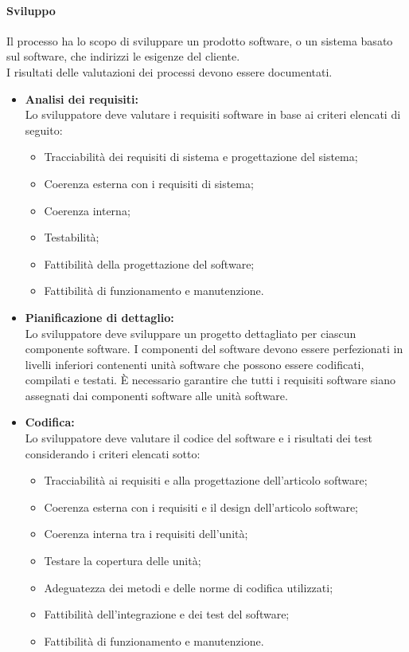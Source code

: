 \paragraph{Sviluppo}
Il processo ha lo scopo di sviluppare un prodotto software, o un sistema basato sul software, che indirizzi le esigenze del cliente. \\
I risultati delle valutazioni dei processi devono essere documentati.
\begin{itemize}
    \item \textbf{Analisi dei requisiti:} \\
    Lo sviluppatore deve valutare i requisiti software in base ai criteri elencati di seguito:
        \begin{itemize}
            \item Tracciabilità dei requisiti di sistema e progettazione del sistema;
            \item Coerenza esterna con i requisiti di sistema;
            \item Coerenza interna;
            \item Testabilità;
            \item Fattibilità della progettazione del software;
            \item Fattibilità di funzionamento e manutenzione.
        \end{itemize}
    \item \textbf{Pianificazione di dettaglio:} \\
    Lo sviluppatore deve sviluppare un progetto dettagliato per ciascun componente software. I componenti del software 
    devono essere perfezionati in livelli inferiori contenenti unità software che possono essere codificati, compilati 
    e testati. È necessario garantire che tutti i requisiti software siano assegnati dai componenti software 
    alle unità software.
    
    \item \textbf{Codifica:} \\
    Lo sviluppatore deve valutare il codice del software e i risultati dei test considerando i criteri elencati sotto:
    \begin{itemize}
        \item Tracciabilità ai requisiti e alla progettazione dell'articolo software;
        \item Coerenza esterna con i requisiti e il design dell'articolo software;
        \item Coerenza interna tra i requisiti dell'unità;
        \item Testare la copertura delle unità;
        \item Adeguatezza dei metodi e delle norme di codifica utilizzati;
        \item Fattibilità dell'integrazione e dei test del software;
        \item Fattibilità di funzionamento e manutenzione.   
    \end{itemize}
\end{itemize}

